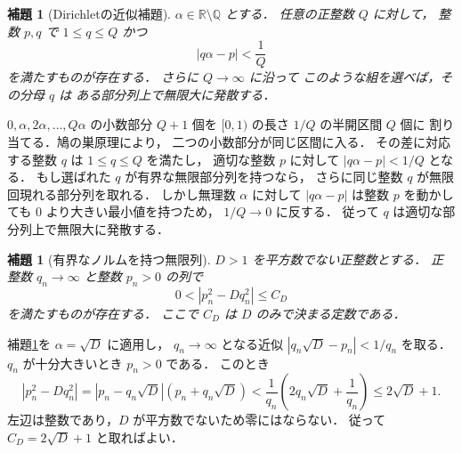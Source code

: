 \documentclass[a5paper,10pt,onecolumn]{jsarticle}
\makeatletter
\theoremstyle{mathnotetheorem}
\newtheorem{lemma}[theorem]{補題}
\renewcommand{\proofname}{証明}
\renewenvironment{proof}[1][\proofname]{%
  \par\pushQED{\qed}\normalfont\topsep4\p@\@plus2\p@\relax
  \trivlist\item[\hskip\labelsep\bfseries #1]\ignorespaces
}{\popQED\endtrivlist\@endpefalse}
\makeatother
\begin{document}
\begin{lemma}[Dirichletの近似補題]\label{lem:dirichlet}
$\alpha\in\mathbb R\setminus\mathbb Q$ とする．
任意の正整数 $Q$ に対して，
整数 $p,q$ で $1\le q\le Q$ かつ
\[
 |q\alpha-p|<\frac1Q
\]
を満たすものが存在する．
さらに $Q\to\infty$ に沿って
このような組を選べば，その分母 $q$ は
ある部分列上で無限大に発散する．
\end{lemma}
\begin{proof}
$0,\alpha,2\alpha,\dots,Q\alpha$ の小数部分
$Q+1$ 個を $[0,1)$ の長さ $1/Q$ の半開区間 $Q$ 個に
割り当てる．鳩の巣原理により，
二つの小数部分が同じ区間に入る．
その差に対応する整数 $q$ は $1\le q\le Q$ を満たし，
適切な整数 $p$ に対して
$|q\alpha-p|<1/Q$ となる．
もし選ばれた $q$ が有界な無限部分列を持つなら，
さらに同じ整数 $q$ が無限回現れる部分列を取れる．
しかし無理数 $\alpha$ に対して
$|q\alpha-p|$ は整数 $p$ を動かしても
$0$ より大きい最小値を持つため，
$1/Q\to0$ に反する．
従って $q$ は適切な部分列上で無限大に発散する．
\end{proof}

\begin{lemma}[有界なノルムを持つ無限列]\label{lem:bounded-norm}
$D>1$ を平方数でない正整数とする．
正整数 $q_n\to\infty$ と整数 $p_n>0$ の列で
\[
 0<|p_n^2-Dq_n^2|\le C_D
\]
を満たすものが存在する．
ここで $C_D$ は $D$ のみで決まる定数である．
\end{lemma}
\begin{proof}
補題\ref{lem:dirichlet}を $\alpha=\sqrt D$ に適用し，
$q_n\to\infty$ となる近似
$|q_n\sqrt D-p_n|<1/q_n$ を取る．
$q_n$ が十分大きいとき $p_n>0$ である．
このとき
\[
 |p_n^2-Dq_n^2|
 =|p_n-q_n\sqrt D|(p_n+q_n\sqrt D)
 <\frac1{q_n}\left(2q_n\sqrt D+\frac1{q_n}\right)
 \le2\sqrt D+1.
\]
左辺は整数であり，$D$ が平方数でないため零にはならない．
従って $C_D=2\sqrt D+1$ と取ればよい．
\end{proof}
\end{document}
